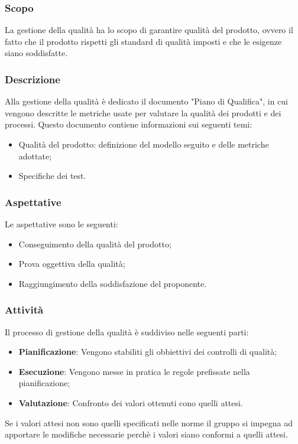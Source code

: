 \documentclass[../norme_di_progetto.tex]{subfiles}
\begin{document}
\subsubsection{Scopo}
La gestione della qualità ha lo scopo di garantire qualità del prodotto, ovvero il fatto che il prodotto rispetti gli standard di qualità imposti e che le esigenze siano soddisfatte.

\subsubsection{Descrizione}
Alla gestione della qualità è dedicato il documento "Piano di Qualifica", in cui vengono descritte le metriche usate per valutare la qualità dei prodotti e dei processi. Questo documento contiene informazioni sui seguenti temi:
\begin{itemize}
    \item Qualità del prodotto: definizione del modello seguito e delle metriche adottate;
    \item Specifiche dei test.
\end{itemize}

\subsubsection{Aspettative}
Le aspettative sono le seguenti:
\begin{itemize}
    \item Conseguimento della qualità del prodotto;
    \item Prova oggettiva della qualità;
    \item Raggiungimento della soddisfazione del proponente.
\end{itemize}

\subsubsection{Attività}
Il processo di gestione della qualità è suddiviso nelle seguenti parti:
\begin{itemize}
    \item \textbf{Pianificazione}: Vengono stabiliti gli obbiettivi dei controlli di qualità;
    \item \textbf{Esecuzione}: Vengono messe in pratica le regole prefissate nella pianificazione;
    \item \textbf{Valutazione}: Confronto dei valori ottenuti cono quelli attesi.
\end{itemize}
Se i valori attesi non sono quelli specificati nelle norme il gruppo si impegna ad apportare le modifiche necessarie perchè i valori siano conformi a quelli attesi.
\end{document}

